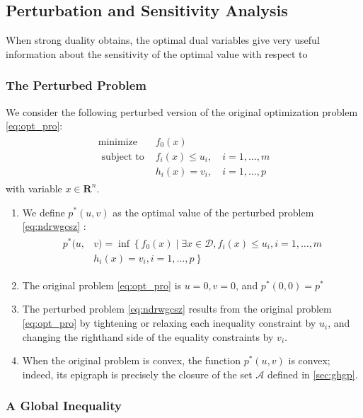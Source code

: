 \documentclass{article}
\begin{document}
\subsection{Perturbation and Sensitivity Analysis}
When strong duality obtains, the optimal dual variables give very useful information about the sensitivity of the optimal value with respect to 
\subsubsection{The Perturbed Problem}
We consider the following perturbed version of the original optimization problem \cref{eq:opt_pro}:
\begin{align}
\begin{array}{ll}
\operatorname{minimize} & f_{0}(x) \\
\text { subject to } & f_{i}(x) \leq u_{i}, \quad i=1, \ldots, m \\
& h_{i}(x)=v_{i}, \quad i=1, \ldots, p
\end{array}\label{eq:ndrwgcsz}
\end{align}
with variable $x \in \mathbf{R}^{n}$. 
\begin{enumerate}
    \item We define $p^{* }(u, v)$ as the optimal value of the perturbed problem \cref{eq:ndrwgcsz} :
\begin{align*}
\begin{aligned}
p^{* }(u, &v)=\inf \left\{f_{0}(x) \mid \exists x \in \mathcal{D}, f_{i}(x) \leq u_{i}, i=1, \ldots, m\right. \\
&\left.h_{i}(x)=v_{i}, i=1, \ldots, p\right\}
\end{aligned}
\end{align*}
    \item The original problem \cref{eq:opt_pro} is $u=0, v=0$, and $p^{* }(0,0)=p^{* }$
    \item The perturbed problem \cref{eq:ndrwgcsz} results from the original problem \cref{eq:opt_pro} by tightening or relaxing each inequality constraint by $u_{i}$, and changing the righthand side of the equality constraints by $v_{i}$.
    \item When the original problem is convex, the function $p^{* }(u, v)$ is convex; indeed, its epigraph is precisely the closure of the set $\mathcal{A}$ defined in \cref{sec:ghgp}.
\end{enumerate} 
\subsubsection{A Global Inequality}
\end{document}
